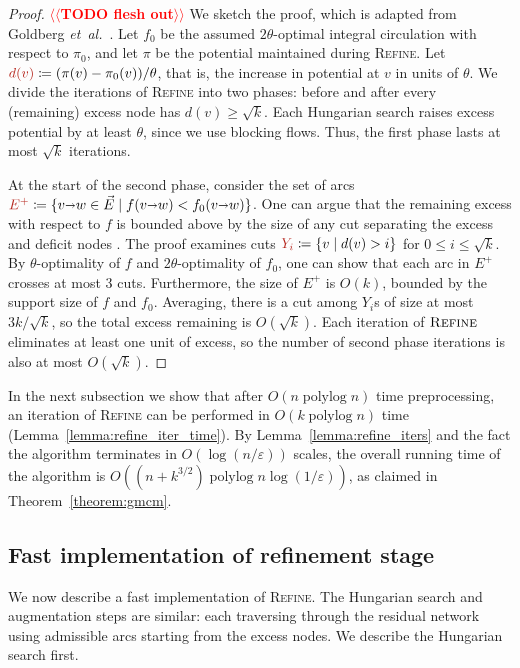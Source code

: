 \documentclass[11pt]{article}
\makeatletter
\def\etal{\emph{et~al.}}
\def\etal{\textit{et~al.}}
\def\polylog{\mathop{\mathrm{polylog}}}
\def\eps{\varepsilon}
\def\arcto{\mathord\shortrightarrow}
\def\arc#1#2{#1\arcto#2}
\numberwithin{figure}{section}
\def\EMPH#1{\textcolor{BrickRed}{{\emph{#1}}}}
\def\n@te#1{\textsf{\boldmath \textbf{$\langle\!\langle$#1$\rangle\!\rangle$}}\leavevmode}
\def\note#1{\textcolor{red}{\n@te{#1}}}
\makeatother
\begin{document}
\begin{proof}
\note{TODO flesh out} %
We sketch the proof, which is adapted from Goldberg \etal~\cite{GHKT17}.
Let $f_0$ be the assumed $2\theta$-optimal integral circulation with respect to $\pi_0$,
and let $\pi$ be the potential maintained during \textsc{Refine}.
Let $\EMPH{$d(v)$} \coloneqq (\pi(v) - \pi_0(v))/\theta$, that is, the increase in potential
at $v$ in units of $\theta$.
We divide the iterations of \textsc{Refine} into two phases: before and after
every (remaining) excess node has $d(v) \geq \sqrt{k}$.
Each Hungarian search raises excess potential by at least $\theta$,
since we use blocking flows.
Thus, the first phase lasts at most $\sqrt{k}$ iterations.

At the start of the second phase, consider the set of arcs
$\EMPH{$E^+$} \coloneqq \{\arc vw \in \vec{E} \mid f(\arc vw) < f_0(\arc vw)\}$.
One can argue that the remaining excess with respect to $f$ is bounded above by
the size of any cut separating the excess and deficit nodes \cite[Lemma~4]{GHKT17}.
The proof examines cuts $\EMPH{$Y_i$} \coloneqq \{v \mid d(v) > i\}$ for $0 \leq i \leq \sqrt{k}$.
By $\theta$-optimality of $f$ and $2\theta$-optimality of $f_0$, one can show
that each arc in $E^+$ crosses at most 3 cuts.
Furthermore, the size of $E^+$ is $O(k)$, bounded by the support size of $f$ and $f_0$.
Averaging, there is a cut among $Y_i$s of size at most $3k/\sqrt{k}$,
so the total excess remaining is $O(\sqrt{k})$.
Each iteration of $\textsc{Refine}$ eliminates at least one unit of excess,
so the number of second phase iterations is also at most $O(\sqrt{k})$.
\end{proof}

In the next subsection we show that after $O(n\polylog n)$ time preprocessing,
an iteration of \textsc{Refine} can be performed in $O(k\polylog n)$ time
(Lemma~\ref{lemma:refine_iter_time}).
By Lemma~\ref{lemma:refine_iters} and the fact the algorithm terminates in
$O(\log(n/\eps))$ scales, the overall running time of the algorithm is
$O((n + k^{3/2})\polylog n \log(1/\eps))$, as claimed in Theorem~\ref{theorem:gmcm}.

\subsection{Fast implementation of refinement stage}
\label{SS:fast_refine}

We now describe a fast implementation of \textsc{Refine}.
The Hungarian search and augmentation steps are similar:
each traversing through the residual network using admissible arcs starting
from the excess nodes.
We describe the Hungarian search first.
\end{document}
